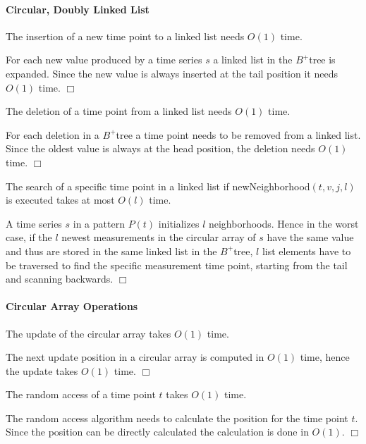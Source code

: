 \documentclass[abstracton,12pt,oneside]{scrreprt}
\newenvironment{proof}
  {\noindent{\bf Proof:\rm}}{\hfill$\Box$\vspace{\medskipamount}}
\begin{document}
\paragraph{Circular, Doubly Linked List}
\begin{mydef}
	The insertion of a new time point to a linked list needs $O(1)$ time.
\end{mydef}
\begin{proof}
	For each new value produced by a time series $s$ a linked list in the $B^+$tree is expanded. Since the new value is always inserted at the tail position it needs $O(1)$ time.
\end{proof}
\begin{mydef}
	The deletion of a time point from a linked list needs $O(1)$ time.
\end{mydef}
\begin{proof}
	For each deletion in a $B^+$tree a time point needs to be removed from a linked list. Since the oldest value is always at the head position, the deletion needs $O(1)$ time.
\end{proof}
\begin{mydef}
	The search of a specific time point in a linked list if newNeighborhood$(t,v,j,l)$ is executed takes at most $O(l)$ time.
\end{mydef}
\begin{proof}
	A time series $s$ in a pattern $P(t)$ initializes $l$ neighborhoods. Hence in the worst case, if the $l$ newest measurements in the circular array of $s$ have the same value and thus are stored in the same linked list in the $B^+$tree, $l$ list elements have to be traversed to find the specific measurement time point, starting from the tail and scanning backwards. 
\end{proof}

\paragraph{Circular Array Operations}
\begin{mydef}
	The update of the circular array takes $O(1)$ time.
\end{mydef}
\begin{proof}
	The next update position in a circular array is computed in $O(1)$ time, hence the update takes $O(1)$ time. 
\end{proof}
\begin{mydef}
	The random access of a time point $t$ takes $O(1)$ time.
\end{mydef}
\begin{proof}
	The random access algorithm needs to calculate the position for the time point $t$. Since the position can be directly calculated the calculation is done in $O(1)$.
\end{proof}
\end{document}
